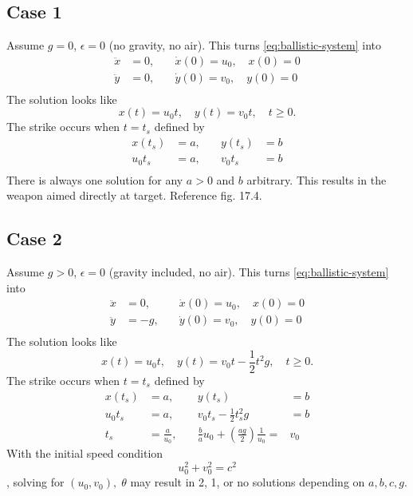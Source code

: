 \documentclass[12pt]{article}
\begin{document}
\subsection{Case 1}
Assume $g=0$, $\epsilon=0$ (no gravity, no air).
This turns \cref{eq:ballistic-system} into
\begin{equation*}
  \begin{aligned}
    \ddot{x}&=0, &\quad \dot{x}(0)=u_0,\quad x(0)=0 \\
    \ddot{y}&=0, &\quad \dot{y}(0)=v_0,\quad y(0)=0 \\
  \end{aligned}
\end{equation*}
The solution looks like
$$x(t) = u_0t, \quad y(t) = v_0t,\quad t\ge0.$$
The strike occurs when $t=t_s$ defined by
\begin{equation*}
  \begin{aligned}
    x(t_s) &= a, &\quad y(t_s)&=b \\
    u_0t_s &= a, &\quad v_0t_s&=b \\
  \end{aligned}
\end{equation*}
There is always one solution for any $a>0$ and $b$ arbitrary. This results in
the weapon aimed directly at target. Reference fig. 17.4.

\subsection{Case 2}
Assume $g>0$, $\epsilon=0$ (gravity included, no air).
This turns \cref{eq:ballistic-system} into
\begin{equation*}
  \begin{aligned}
    \ddot{x}&=0, &\quad \dot{x}(0)=u_0,\quad x(0)=0 \\
    \ddot{y}&=-g, &\quad \dot{y}(0)=v_0,\quad y(0)=0 \\
  \end{aligned}
\end{equation*}
The solution looks like
$$x(t) = u_0t, \quad y(t) = v_0t-\frac{1}{2}t^2g,\quad t\ge0.$$
The strike occurs when $t=t_s$ defined by
\begin{equation*}
  \begin{aligned}
    x(t_s) &= a, &\quad y(t_s)&=b \\
    u_0t_s &= a, &\quad v_0t_s-\frac{1}{2}t_s^2g&=b \\
    t_s &= \frac{a}{u_0}, &\quad \frac{b}{a}u_0+\left(\frac{ag}{2}\right)\frac{1}{u_0} =& v_0
  \end{aligned}
\end{equation*}
With the initial speed condition $$u_0^2+v_0^2=c^2$$, solving for
$(u_0,v_0),\;\theta$ may result in 2, 1, or no solutions depending on $a,b,c,g$.
\end{document}
